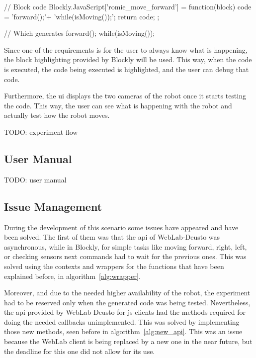 \begin{center}
\begin{minipage}{.9\textwidth}
\singlespace
{}
\begin{pyglist}[language=javascript, caption={Generated code.},
	label={alg:generated}, listingname={Algorithm}, numbers=left]
// Block code
Blockly.JavaScript['romie_move_forward'] = function(block) {
    code = 'forward();\n'+
            'while(isMoving());\n';
    return code;
};

// Which generates
forward();
while(isMoving());
\end{pyglist}
\end{minipage}
\end{center}

Since one of the requirements is for the user to always know what is happening, the block
highlighting provided by Blockly will be used. This way, when the code is executed, the code being
executed is highlighted, and the user can debug that code.

Furthermore, the \acrlong{ui} displays the two cameras of the robot once it starts testing the code.
This way, the user can see what is happening with the robot and actually test how the robot moves.

TODO: experiment flow

\subsection{User Manual}

TODO: user manual

\subsection{Issue Management}

During the development of this scenario some issues have appeared and have been solved. The first of
them was that the \acrshort{api} of WebLab-Deusto was asynchronous, while in Blockly, for simple
tasks like moving forward, right, left, or checking sensors next commands had to wait for the
previous ones. This was solved using the contexts and wrappers for the functions that have been
explained before, in algorithm~\ref{alg:wrapper}.

Moreover, and due to the needed higher availability of the robot, the experiment had to be reserved
only when the generated code was being tested. Nevertheless, the \acrshort{api} provided by
WebLab-Deusto for \acrlong{js} clients had the methods required for doing the needed callbacks
unimplemented. This was solved by implementing those new methods, seen before in
algorithm~\ref{alg:new_api}. This was an issue because the WebLab client is being replaced by a new
one in the near future, but the deadline for this one did not allow for its use.

